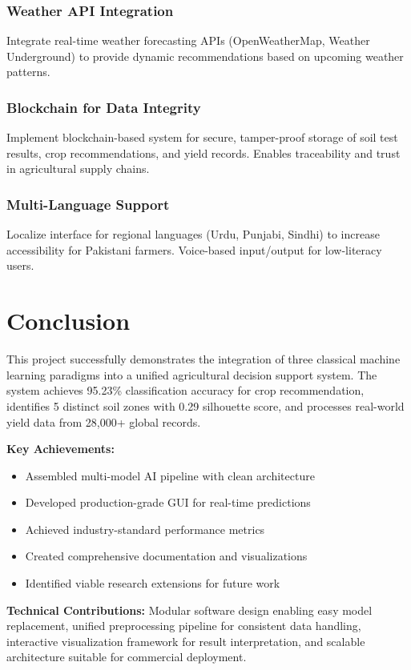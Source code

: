 \documentclass[conference]{IEEEtran}
\begin{document}
\subsubsection{Weather API Integration}
Integrate real-time weather forecasting APIs (OpenWeatherMap, Weather Underground) to provide dynamic recommendations based on upcoming weather patterns.

\subsubsection{Blockchain for Data Integrity}
Implement blockchain-based system for secure, tamper-proof storage of soil test results, crop recommendations, and yield records. Enables traceability and trust in agricultural supply chains.

\subsubsection{Multi-Language Support}
Localize interface for regional languages (Urdu, Punjabi, Sindhi) to increase accessibility for Pakistani farmers. Voice-based input/output for low-literacy users.

\section{Conclusion}

This project successfully demonstrates the integration of three classical machine learning paradigms into a unified agricultural decision support system. The system achieves 95.23\% classification accuracy for crop recommendation, identifies 5 distinct soil zones with 0.29 silhouette score, and processes real-world yield data from 28,000+ global records.

\textbf{Key Achievements:}
\begin{itemize}
    \item Assembled multi-model AI pipeline with clean architecture
    \item Developed production-grade GUI for real-time predictions
    \item Achieved industry-standard performance metrics
    \item Created comprehensive documentation and visualizations
    \item Identified viable research extensions for future work
\end{itemize}

\textbf{Technical Contributions:}
Modular software design enabling easy model replacement, unified preprocessing pipeline for consistent data handling, interactive visualization framework for result interpretation, and scalable architecture suitable for commercial deployment.
\end{document}
